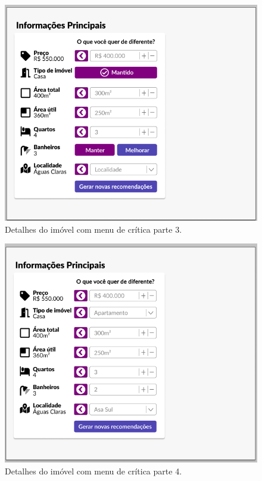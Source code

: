 \begin{figure}[H]
    \centering
    \includegraphics[scale=0.8]{figuras/proposta/prototipo_critico3.png}
    \caption[Detalhes do imóvel com menu de crítica parte 3]{Detalhes do imóvel com menu de crítica parte 3.}
    \label{fig:prototipo_critico3}
\end{figure}

\begin{figure}[H]
    \centering
    \includegraphics[scale=0.8]{figuras/proposta/prototipo_critico4.png}
    \caption[Detalhes do imóvel com menu de crítica parte 4]{Detalhes do imóvel com menu de crítica parte 4.}
    \label{fig:prototipo_critico4}
\end{figure}

